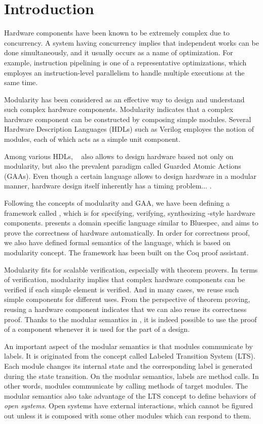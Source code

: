 \chapter{Introduction}

Hardware components have been known to be extremely complex due to
concurrency. A system having concurrency implies that independent
works can be done simultaneously, and it usually occurs as a name of
optimization. For example, instruction pipelining is one of a
representative optimizations, which employes an instruction-level
parallelism to handle multiple executions at the same time.

Modularity has been considered as an effective way to design and
understand such complex hardware components. Modularity indicates that
a complex hardware component can be constructed by composing simple
modules. Several Hardware Description Languages (HDLs) such as Verilog
employes the notion of modules, each of which acts as a simple unit
component.

Among various HDLs, \Bluespec{}~\cite{bsdef, bsref} also allows to
design hardware based not only on modularity, but also the prevalent
paradigm called Guarded Atomic Actions (GAAs). Even though a certain
language allows to design hardware in a modular manner, hardware
design itself inherently has a timing problem... .

Following the concepts of modularity and GAA, we have been defining a
framework called \Kami{}, which is for specifying, verifying,
synthesizing \Bluespec{}-style hardware components. \Kami{} presents a
domain specific language similar to Bluespec, and aims to prove the
correctness of hardware automatically. In order for correctness proof,
we also have defined formal semantics of the \Kami{} language, which
is based on modularity concept. The framework has been built on the
Coq proof assistant.

Modularity fits for scalable verification, especially with theorem
provers. In terms of verification, modularity implies that complex
hardware components can be verified if each simple element is
verified. And in many cases, we reuse such simple components for
different uses. From the perspective of theorem proving, reusing a
hardware component indicates that we can also reuse its correctness
proof. Thanks to the modular semantics in \Kami{}, it is indeed
possible to use the proof of a component whenever it is used for the
part of a design.

An important aspect of the modular semantics is that modules
communicate by labels. It is originated from the concept called
Labeled Transition System (LTS). Each module changes its internal
state and the corresponding label is generated during the state
transition. On the modular semantics, labels are method calls. In
other words, modules communicate by calling methods of target modules.
The modular semantics also take advantage of the LTS concept to define
behaviors of \emph{open systems}. Open systems have external
interactions, which cannot be figured out unless it is composed with
some other modules which can respond to them.

